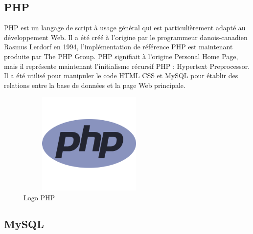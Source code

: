 \documentclass[12pt]{report}
\begin{document}
\vspace{-0.18in}

\subsection{PHP}

PHP est un langage de script à usage général qui est particulièrement adapté au développement Web. Il a été créé à l'origine par le programmeur danois-canadien Rasmus Lerdorf en 1994, l'implémentation de référence PHP est maintenant produite par The PHP Group. PHP signifiait à l'origine Personal Home Page, mais il représente maintenant l'initialisme récursif PHP : Hypertext Preprocessor.
\\
Il a été utilisé pour manipuler le code HTML CSS et MySQL pour établir des relations entre la base de données et la page Web principale.

\vspace{-0.2in}

\begin{figure}[h]
\centering
    \includegraphics[width = 2.8in, height = 2.0in]{../Images/PHP.png}
\vspace{-0.3in}
\caption{Logo PHP}
\end{figure}

\newpage

\subsection{MySQL}
\end{document}
